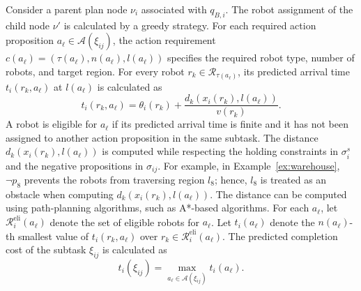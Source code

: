\documentclass[lettersize,journal]{IEEEtran}
\theoremstyle{italiclemma}
\theoremstyle{italiclemma}
\theoremstyle{definition}
\begin{document}
Consider a parent plan node $\nu_i$ associated with $q_{B,i}$. The robot assignment of the child node $\nu'$ is calculated by a greedy strategy. For each required action proposition $a_\ell\in\mathcal A(\xi_{ij})$, the action requirement
$c(a_\ell)=(\tau(a_\ell),n(a_\ell),l(a_\ell))$ specifies the required robot type, number of robots, and target region. For every robot $r_k\in\mathcal R_{\tau(a_\ell)}$, its predicted arrival time $t_i(r_k,a_\ell)$ at $l(a_\ell)$ is calculated as
\begin{equation}
t_i(r_k,a_\ell) = \theta_i(r_k) + \frac{d_k(x_i(r_k),l(a_\ell))}{v(r_k)}.
\label{eq:predicted_arrival}
\end{equation} 
A robot is eligible for $a_\ell$ if its predicted arrival time is finite and it has not been assigned to another action proposition in the same subtask. The distance $d_k(x_{i}(r_k),l(a_\ell))$ is computed while respecting the holding constraints in $\sigma_{i}^s$ and the negative propositions in $\sigma_{ij}$.  For example, in Example~\ref{ex:warehouse},  $\neg p_8$ prevents the robots from traversing region $l_8$; hence, $l_8$ is treated as an obstacle when computing $d_k(x_{i}(r_k),l(a_\ell))$. The distance can be computed using path-planning algorithms, such as  A*-based algorithms.
For each $a_\ell$, let $\mathcal R_i^{\mathrm{eli}}(a_\ell)$ denote the set of eligible robots for $a_\ell$. Let $t_i(a_\ell)$ denote the $n(a_\ell)$-th smallest value of $t_i(r_k,a_\ell)$ over $r_k\in\mathcal R_i^{\mathrm{eli}}(a_\ell)$. The predicted completion cost of the subtask $\xi_{ij}$ is calculated as
\begin{equation}
t_i(\xi_{ij})
=
\max_{a_\ell\in\mathcal A(\xi_{ij})}
t_i(a_\ell).
\label{eq:subtask_completion_time}
\end{equation}
\end{document}
